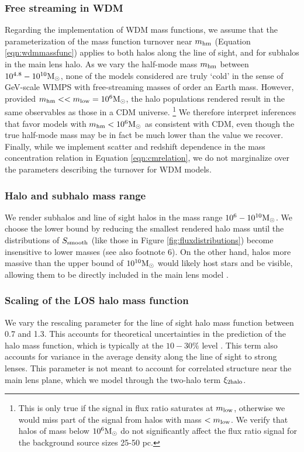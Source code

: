 \subsubsection{Free streaming in WDM}
Regarding the implementation of WDM mass functions, we assume that the parameterization of the mass function turnover near ${m_{\rm{hm}}}$ (Equation \ref{eqn:wdmmassfunc}) applies to both halos along the line of sight, and for subhalos in the main lens halo. As we vary the half-mode mass ${m_{\rm{hm}}}$ between $10^{4.8} - 10^{10} {\rm{M}_{\odot}}$, none of the models considered are truly `cold' in the sense of GeV-scale WIMPS with free-streaming masses of order an Earth mass. However, provided ${m_{\rm{hm}}} << m_{\rm{low}} = 10^6 {\rm{M}_{\odot}}$, the halo populations rendered result in the same observables as those in a CDM universe. \footnote{This is only true if the signal in flux ratio saturates at $m_{\rm{low}}$, otherwise we would miss part of the signal from halos with mass $<m_{\rm{low}}$. We verify that halos of mass below $10^6 {\rm{M}_{\odot}}$ do not significantly affect the flux ratio signal for the background source sizes 25-50 pc.} We therefore interpret inferences that favor models with ${m_{\rm{hm}}} <  10^6 {\rm{M}_{\odot}}$ as consistent with CDM, even though the true half-mode mass may be in fact be much lower than the value we recover. Finally, while we implement scatter and redshift dependence in the mass concentration relation in Equation \ref{eqn:cmrelation}, we do not marginalize over the parameters describing the turnover for WDM models. 

\subsubsection{Halo and subhalo mass range}
We render subhalos and line of sight halos in the mass range $10^6 - 10^{10} {\rm{M}_{\odot}}$. We choose the lower bound by reducing the smallest rendered halo mass until the distributions of $S_{\rm{smooth}}$ (like those in Figure \ref{fig:fluxdistributions}) become insensitive to lower masses (see also footnote 6). On the other hand, halos more massive than the upper bound of $10^{10} {\rm{M}_{\odot}}$ would likely host stars and be visible, allowing them to be directly included in the main lens model \cite[e.g.][]{Birrer++19}.

\subsubsection{Scaling of the LOS halo mass function}
We vary the rescaling parameter for the line of sight halo mass function between 0.7 and 1.3. This accounts for theoretical uncertainties in the prediction of the halo mass function, which is typically at the $10-30 \%$ level \cite{Despali++16}. This term also accounts for variance in the average density along the line of sight to strong lenses. This parameter is not meant to account for correlated structure near the main lens plane, which we model through the two-halo term $\xi_{\rm{2halo}}$.

